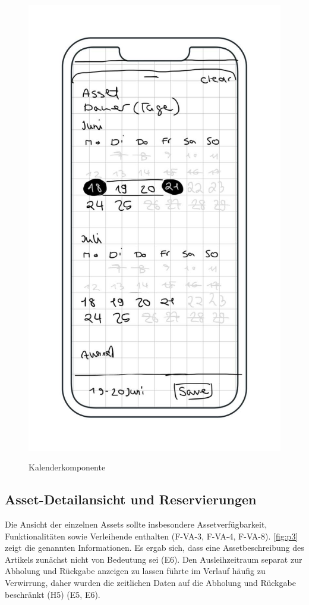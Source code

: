 \begin{figure}[h]
    \centering
    \includegraphics[scale=0.4]{Bilder/Mockups/Kalender.jpg}\hspace{2em}
    \label{fig:kalender}
    \caption[Kalenderkomponente]{Kalenderkomponente}
\end{figure}

\subsection{Asset-Detailansicht und Reservierungen}
Die Ansicht der einzelnen Assets sollte insbesondere Assetverfügbarkeit, Funktionalitäten sowie
Verleihende enthalten (F-VA-3, F-VA-4, F-VA-8). \ref{fig:p3} zeigt die genannten Informationen. Es
ergab sich, dass eine Assetbeschreibung des Artikels zunächst nicht von Bedeutung sei (E6). Den
Ausleihzeitraum separat zur Abholung und Rückgabe anzeigen zu lassen führte im Verlauf häufig zu
Verwirrung, daher wurden die zeitlichen Daten auf die Abholung und Rückgabe beschränkt (H5) (E5, E6).

